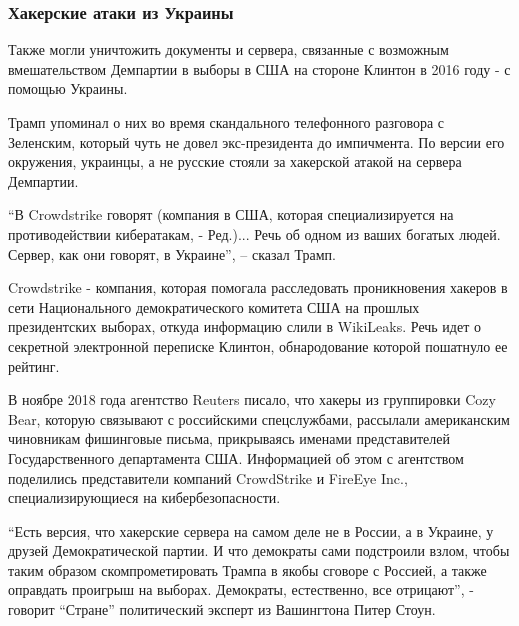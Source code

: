  
 
 
 
 

\subsubsection{Хакерские атаки из Украины} 

Также могли уничтожить документы и сервера, связанные с возможным
вмешательством Демпартии в выборы в США на стороне Клинтон в 2016 году - с
помощью Украины.

Трамп упоминал о них во время скандального телефонного разговора с Зеленским,
который чуть не довел экс-президента до импичмента. По версии его окружения,
украинцы, а не русские стояли за хакерской атакой на сервера Демпартии.

\enquote{В Crowdstrike говорят (компания в США, которая специализируется на
противодействии кибератакам, - Ред.)... Речь об одном из ваших богатых людей.
Сервер, как они говорят, в Украине}, – сказал Трамп.

Crowdstrike - компания, которая помогала расследовать проникновения хакеров в
сети Национального демократического комитета США на прошлых президентских
выборах, откуда информацию слили в WikiLeaks. Речь идет о секретной электронной
переписке Клинтон, обнародование которой пошатнуло ее рейтинг.

В ноябре 2018 года агентство Reuters писало, что хакеры из группировки Cozy
Bear, которую связывают с российскими спецслужбами, рассылали американским
чиновникам фишинговые письма, прикрываясь именами представителей
Государственного департамента США. Информацией об этом с агентством поделились
представители компаний CrowdStrike и FireEye Inc., специализирующиеся на
кибербезопасности.

\enquote{Есть версия, что хакерские сервера на самом деле не в России, а в Украине, у
друзей Демократической партии. И что демократы сами подстроили взлом, чтобы
таким образом скомпрометировать Трампа в якобы сговоре с Россией, а также
оправдать проигрыш на выборах. Демократы, естественно, все отрицают}, - говорит
\enquote{Стране} политический эксперт из Вашингтона Питер Стоун.  

